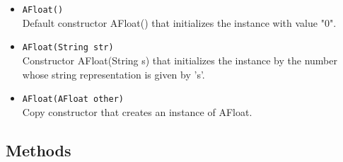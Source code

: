 \documentclass{article}
\begin{document}
\begin{itemize}
    \item \texttt{AFloat()} \\
    Default constructor AFloat() that initializes the instance with value "0".

    \item \texttt{AFloat(String str)} \\
    Constructor AFloat(String s) that initializes the instance by the number whose string representation is given by ’s’.

    \item \texttt{AFloat(AFloat other)} \\
    Copy constructor that creates an instance of AFloat.
    
\end{itemize}

\subsection*{Methods}
\end{document}
